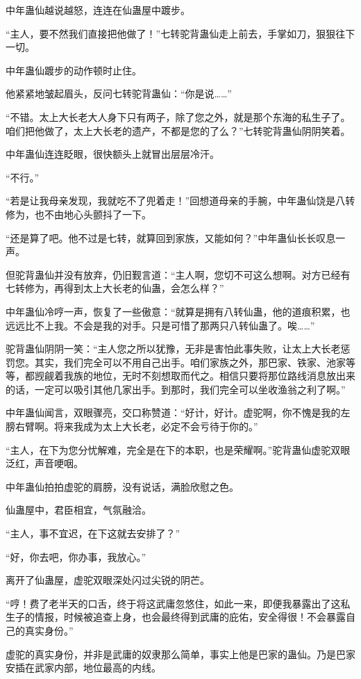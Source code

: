 \begin{this_body}
中年蛊仙越说越怒，连连在仙蛊屋中踱步。

“主人，要不然我们直接把他做了！”七转驼背蛊仙走上前去，手掌如刀，狠狠往下一切。

中年蛊仙踱步的动作顿时止住。

他紧紧地皱起眉头，反问七转驼背蛊仙：“你是说……”

“不错。太上大长老大人身下只有两子，除了您之外，就是那个东海的私生子了。咱们把他做了，太上大长老的遗产，不都是您的了么？”七转驼背蛊仙阴阴笑着。

中年蛊仙连连眨眼，很快额头上就冒出层层冷汗。

“不行。”

“若是让我母亲发现，我就吃不了兜着走！”回想道母亲的手腕，中年蛊仙饶是八转修为，也不由地心头颤抖了一下。

“还是算了吧。他不过是七转，就算回到家族，又能如何？”中年蛊仙长长叹息一声。

但驼背蛊仙并没有放弃，仍旧觐言道：“主人啊，您切不可这么想啊。对方已经有七转修为，再得到太上大长老的仙蛊，会怎么样？”

中年蛊仙冷哼一声，恢复了一些傲意：“就算是拥有八转仙蛊，他的道痕积累，也远远比不上我。不会是我的对手。只是可惜了那两只八转仙蛊了。唉……”

驼背蛊仙阴阴一笑：“主人您之所以犹豫，无非是害怕此事失败，让太上大长老惩罚您。其实，我们完全可以不用自己出手。咱们家族之外，那巴家、铁家、池家等等，都觊觎着我族的地位，无时不刻想取而代之。相信只要将那位路线消息放出来的话，一定可以吸引其他几家出手。到那时，我们完全可以坐收渔翁之利了啊。”

中年蛊仙闻言，双眼骤亮，交口称赞道：“好计，好计。虚驼啊，你不愧是我的左膀右臂啊。将来我成为太上大长老，必定不会亏待于你的。”

“主人，在下为您分忧解难，完全是在下的本职，也是荣耀啊。”驼背蛊仙虚驼双眼泛红，声音哽咽。

中年蛊仙拍拍虚驼的肩膀，没有说话，满脸欣慰之色。

仙蛊屋中，君臣相宜，气氛融洽。

“主人，事不宜迟，在下这就去安排了？”

“好，你去吧，你办事，我放心。”

离开了仙蛊屋，虚驼双眼深处闪过尖锐的阴芒。

“哼！费了老半天的口舌，终于将这武庸忽悠住，如此一来，即便我暴露出了这私生子的情报，时候被追查上身，也会最终得到武庸的庇佑，安全得很！不会暴露自己的真实身份。”

虚驼的真实身份，并非是武庸的奴隶那么简单，事实上他是巴家的蛊仙。乃是巴家安插在武家内部，地位最高的内线。


\end{this_body}
